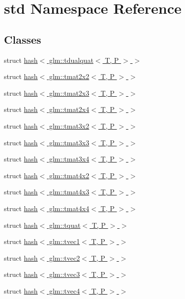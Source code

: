 \hypertarget{namespacestd}{}\section{std Namespace Reference}
\label{namespacestd}
\subsection*{Classes}
\begin{DoxyCompactItemize}
\item 
struct \hyperlink{structstd_1_1hash_3_01glm_1_1tdualquat_3_01_t_00_01_p_01_4_01_4}{hash$<$ glm\+::tdualquat$<$ T, P $>$ $>$}
\item 
struct \hyperlink{structstd_1_1hash_3_01glm_1_1tmat2x2_3_01_t_00_01_p_01_4_01_4}{hash$<$ glm\+::tmat2x2$<$ T, P $>$ $>$}
\item 
struct \hyperlink{structstd_1_1hash_3_01glm_1_1tmat2x3_3_01_t_00_01_p_01_4_01_4}{hash$<$ glm\+::tmat2x3$<$ T, P $>$ $>$}
\item 
struct \hyperlink{structstd_1_1hash_3_01glm_1_1tmat2x4_3_01_t_00_01_p_01_4_01_4}{hash$<$ glm\+::tmat2x4$<$ T, P $>$ $>$}
\item 
struct \hyperlink{structstd_1_1hash_3_01glm_1_1tmat3x2_3_01_t_00_01_p_01_4_01_4}{hash$<$ glm\+::tmat3x2$<$ T, P $>$ $>$}
\item 
struct \hyperlink{structstd_1_1hash_3_01glm_1_1tmat3x3_3_01_t_00_01_p_01_4_01_4}{hash$<$ glm\+::tmat3x3$<$ T, P $>$ $>$}
\item 
struct \hyperlink{structstd_1_1hash_3_01glm_1_1tmat3x4_3_01_t_00_01_p_01_4_01_4}{hash$<$ glm\+::tmat3x4$<$ T, P $>$ $>$}
\item 
struct \hyperlink{structstd_1_1hash_3_01glm_1_1tmat4x2_3_01_t_00_01_p_01_4_01_4}{hash$<$ glm\+::tmat4x2$<$ T, P $>$ $>$}
\item 
struct \hyperlink{structstd_1_1hash_3_01glm_1_1tmat4x3_3_01_t_00_01_p_01_4_01_4}{hash$<$ glm\+::tmat4x3$<$ T, P $>$ $>$}
\item 
struct \hyperlink{structstd_1_1hash_3_01glm_1_1tmat4x4_3_01_t_00_01_p_01_4_01_4}{hash$<$ glm\+::tmat4x4$<$ T, P $>$ $>$}
\item 
struct \hyperlink{structstd_1_1hash_3_01glm_1_1tquat_3_01_t_00_01_p_01_4_01_4}{hash$<$ glm\+::tquat$<$ T, P $>$ $>$}
\item 
struct \hyperlink{structstd_1_1hash_3_01glm_1_1tvec1_3_01_t_00_01_p_01_4_01_4}{hash$<$ glm\+::tvec1$<$ T, P $>$ $>$}
\item 
struct \hyperlink{structstd_1_1hash_3_01glm_1_1tvec2_3_01_t_00_01_p_01_4_01_4}{hash$<$ glm\+::tvec2$<$ T, P $>$ $>$}
\item 
struct \hyperlink{structstd_1_1hash_3_01glm_1_1tvec3_3_01_t_00_01_p_01_4_01_4}{hash$<$ glm\+::tvec3$<$ T, P $>$ $>$}
\item 
struct \hyperlink{structstd_1_1hash_3_01glm_1_1tvec4_3_01_t_00_01_p_01_4_01_4}{hash$<$ glm\+::tvec4$<$ T, P $>$ $>$}
\end{DoxyCompactItemize}
